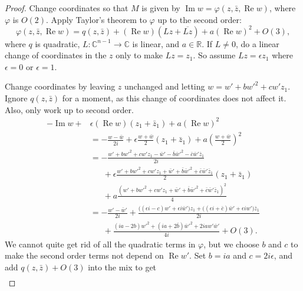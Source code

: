 \documentclass[12pt,openany]{book}
\renewcommand{\Re}{\operatorname{Re}}
\renewcommand{\Im}{\operatorname{Im}}
\newcommand{\C}{{\mathbb{C}}}
\newcommand{\R}{{\mathbb{R}}}
\theoremstyle{plain}
\theoremstyle{remark}
\theoremstyle{definition}
\theoremstyle{exercise}
\theoremstyle{example}
\begin{document}
\begin{proof}
Change coordinates so that $M$ is given by
$\Im w = \varphi(z,\bar{z},\Re w)$,  where $\varphi$ is $O(2)$.
Apply Taylor's theorem to $\varphi$ up to the second order:
\begin{equation*}
\varphi(z,\bar{z},\Re w) = q(z,\bar{z}) + (\Re w) (Lz + \overline{Lz}) +
a {(\Re w)}^2 +
O(3) ,
\end{equation*}
where $q$ is quadratic, $L \colon \C^{n-1} \to \C$ is linear, and $a \in \R$.
If $L
\not= 0$, do
a linear change of coordinates in the $z$ only to make $Lz = z_1$.  So
assume $Lz = \epsilon z_1$ where $\epsilon = 0$ or $\epsilon =
1$. 

Change coordinates
by leaving $z$ unchanged and letting $w = w'+bw'^2+cw'z_1$.  Ignore
$q(z,\bar{z})$ for a moment, as
this change of coordinates does not affect it.  Also, only work up to
second order.
\begin{equation*}
\begin{split}
-\Im w +
& \epsilon (\Re w) (z_1+\bar{z}_1)
+
a {(\Re w)}^2
\\
& =
-\frac{w-\bar{w}}{2i} +
\epsilon \frac{w+\bar{w}}{2}(z_1+\bar{z}_1)
+
a{\left(\frac{w+\bar{w}}{2}\right)}^2
\\
& =
-\frac{w'+bw'^2+cw'z_1-\bar{w}'-\bar{b}\bar{w}'^2-\bar{c}\bar{w}'\bar{z}_1}{2i} 
\\
& \phantom{=}~
+\epsilon \frac{w'+bw'^2+cw'z_1+\bar{w}'+\bar{b}\bar{w}'^2+\bar{c}\bar{w}'\bar{z}_1}{2}(z_1+\bar{z}_1)
\\
& \phantom{=}~
+ a \frac{{(w'+bw'^2+cw'z_1+\bar{w}'+\bar{b}\bar{w}'^2+\bar{c}\bar{w}'\bar{z}_1)}^2}{4}
\\
& =
-\frac{w'-\bar{w}'}{2i} 
+\frac{
\bigl((\epsilon i-c)w'
+\epsilon i\bar{w}'\bigr)z_1
+\bigl((\epsilon i+\bar{c})\bar{w}'
+\epsilon iw'\bigr)\bar{z}_1
}{2i}
\\
& \phantom{=}~
+ \frac{(ia-2b)w'^2+(ia+2\bar{b})\bar{w}'^2+2iaw'\bar{w}'}{4i}
+O(3) .
\end{split}
\end{equation*}
We cannot quite get rid of all the quadratic terms in $\varphi$, but we 
choose $b$ and $c$ to make the second order terms not depend on $\Re w'$.
Set $b=ia$ and $c=2i\epsilon$, and add $q(z,\bar{z}) + O(3)$ into the mix
to get
\begin{equation*}
\begin{split}

\end{split}
\end{equation*}
\end{proof}
\end{document}
